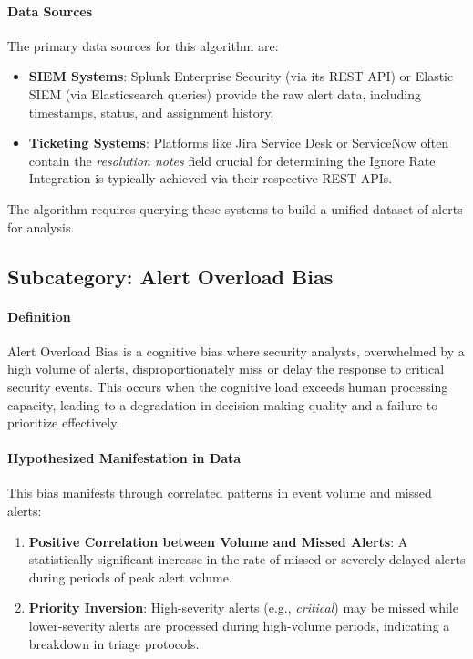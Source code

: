 \documentclass[11pt, a4paper]{article}
\begin{document}
\paragraph{Data Sources} The primary data sources for this algorithm are:
\begin{itemize}
    \item \textbf{SIEM Systems}: Splunk Enterprise Security (via its REST API) or Elastic SIEM (via Elasticsearch queries) provide the raw alert data, including timestamps, status, and assignment history.
    \item \textbf{Ticketing Systems}: Platforms like Jira Service Desk or ServiceNow often contain the \textit{resolution notes} field crucial for determining the Ignore Rate. Integration is typically achieved via their respective REST APIs.
\end{itemize}
The algorithm requires querying these systems to build a unified dataset of alerts for analysis.

\subsection{Subcategory: Alert Overload Bias}
\label{subsec:alert_overload_bias}

\paragraph{Definition} Alert Overload Bias is a cognitive bias where security analysts, overwhelmed by a high volume of alerts, disproportionately miss or delay the response to critical security events. This occurs when the cognitive load exceeds human processing capacity, leading to a degradation in decision-making quality and a failure to prioritize effectively.

\paragraph{Hypothesized Manifestation in Data} This bias manifests through correlated patterns in event volume and missed alerts:
\begin{enumerate}
    \item \textbf{Positive Correlation between Volume and Missed Alerts}: A statistically significant increase in the rate of missed or severely delayed alerts during periods of peak alert volume.
    \item \textbf{Priority Inversion}: High-severity alerts (e.g., \textit{critical}) may be missed while lower-severity alerts are processed during high-volume periods, indicating a breakdown in triage protocols.
\end{enumerate}
\end{document}
